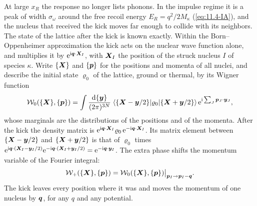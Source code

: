 At large $x_R$ the response no longer lists phonons. In the impulse regime it is a peak of width $\sigma_\omega$ around the free recoil energy $E_R = q^2/2M_\kappa$ (\cref{eq:11.4-IA}), and the nucleus that received the kick moves far enough to collide with its neighbors. The state of the lattice after the kick is known exactly. Within the Born--Oppenheimer approximation the kick acts on the nuclear wave function alone, and multiplies it by $\mathrm{e}^{\mathrm{i}\bm{q}\cdot\bm{X}_I}$, with $\bm{X}_I$ the position of the struck nucleus $I$ of species $\kappa$. Write $\{\bm{X}\}$ and $\{\bm{p}\}$ for the positions and momenta of all nuclei, and describe the initial state $\varrho_0$ of the lattice, ground or thermal, by its Wigner function
\begin{equation*}
  \mathcal{W}_0(\{\bm{X}\},\{\bm{p}\}) = \int\frac{\mathrm{d}\{\bm{y}\}}{(2\pi)^{3N}}\;\langle\{\bm{X} - \bm{y}/2\}|\varrho_0|\{\bm{X} + \bm{y}/2\}\rangle\,\mathrm{e}^{\mathrm{i}\sum_J\bm{p}_J\cdot\bm{y}_J} ,
\end{equation*}
whose marginals are the distributions of the positions and of the momenta. After the kick the density matrix is $\mathrm{e}^{\mathrm{i}\bm{q}\cdot\bm{X}_I}\varrho_0\,\mathrm{e}^{-\mathrm{i}\bm{q}\cdot\bm{X}_I}$. Its matrix element between $\{\bm{X} - \bm{y}/2\}$ and $\{\bm{X} + \bm{y}/2\}$ is that of $\varrho_0$ times $\mathrm{e}^{\mathrm{i}\bm{q}\cdot(\bm{X}_I - \bm{y}_I/2)}\mathrm{e}^{-\mathrm{i}\bm{q}\cdot(\bm{X}_I + \bm{y}_I/2)} = \mathrm{e}^{-\mathrm{i}\bm{q}\cdot\bm{y}_I}$. The extra phase shifts the momentum variable of the Fourier integral:
\begin{equation}
  \mathcal{W}_+(\{\bm{X}\},\{\bm{p}\}) = \mathcal{W}_0(\{\bm{X}\},\{\bm{p}\})\big|_{\bm{p}_I \to \bm{p}_I - \bm{q}} .
  \label{eq:19.1-wigner}
\end{equation}
The kick leaves every position where it was and moves the momentum of one nucleus by $\bm{q}$, for any $q$ and any potential.

